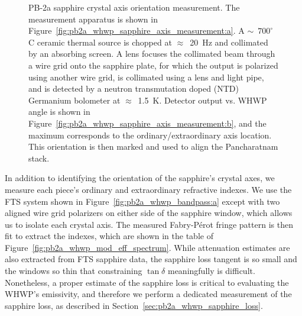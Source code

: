 \begin{figure}[!t]
    \centering
    \caption[PB-2a sapphire crystal axis orientation measurement]{PB-2a sapphire crystal axis orientation measurement. The measurement apparatus is shown in Figure~\ref{fig:pb2a_whwp_sapphire_axis_measurement:a}. A $\sim$~$700^{\circ}$ C ceramic thermal source is chopped at $\approx$~20~Hz and collimated by an absorbing screen. A lens focuses the collimated beam through a wire grid onto the sapphire plate, for which the output is polarized using another wire grid, is collimated using a lens and light pipe, and is detected by a neutron transmutation doped (NTD) Germanium bolometer at $\approx$~1.5~K. Detector output vs. WHWP angle is shown in Figure~\ref{fig:pb2a_whwp_sapphire_axis_measurement:b}, and the maximum corresponds to the ordinary/extraordinary axis location. This orientation is then marked and used to align the Pancharatnam stack.}
    \label{fig:pb2a_whwp_sapphire_axis_measurement}
\end{figure}

In addition to identifying the orientation of the sapphire's crystal axes, we measure each piece's ordinary and extraordinary refractive indexes. We use the FTS system shown in Figure~\ref{fig:pb2a_whwp_bandpass:a} except with two aligned wire grid polarizers on either side of the sapphire window, which allows us to isolate each crystal axis. The measured Fabry-P\'{e}rot fringe pattern is then fit to extract the indexes, which are shown in the table of Figure~\ref{fig:pb2a_whwp_mod_eff_spectrum}. While attenuation estimates are also extracted from FTS sapphire data, the sapphire loss tangent is so small and the windows so thin that constraining $\tan \delta$ meaningfully is difficult. Nonetheless, a proper estimate of the sapphire loss is critical to evaluating the WHWP's emissivity, and therefore we perform a dedicated measurement of the sapphire loss, as described in Section~\ref{sec:pb2a_whwp_sapphire_loss}.


